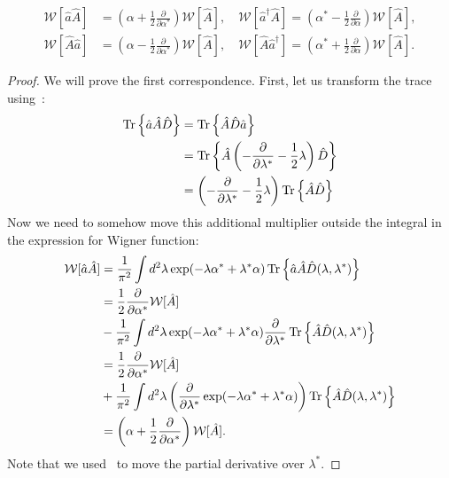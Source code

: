 \begin{theorem}
\label{thm:formalism:sm-wigner:correspondences}
\begin{equation*}
\begin{split}
	\mathcal{W} [ \hat{a} \hat{A} ]
		& = \left( \alpha + \frac{1}{2} \frac{\partial}{\partial \alpha^*} \right) \mathcal{W}[\hat{A}],
	\quad
	\mathcal{W} [ \hat{a}^\dagger \hat{A} ]
		= \left( \alpha^* - \frac{1}{2} \frac{\partial}{\partial \alpha} \right) \mathcal{W}[\hat{A}], \\
	\mathcal{W} [ \hat{A} \hat{a} ]
		& = \left( \alpha - \frac{1}{2} \frac{\partial}{\partial \alpha^*} \right) \mathcal{W}[\hat{A}],
	\quad
	\mathcal{W} [ \hat{A} \hat{a}^\dagger ]
		= \left( \alpha^* + \frac{1}{2} \frac{\partial}{\partial \alpha} \right) \mathcal{W}[\hat{A}].
\end{split}
\end{equation*}
\end{theorem}
\begin{proof}
We will prove the first correspondence.
First, let us transform the trace using~:
\begin{equation*}
\begin{split}
	\operatorname{Tr} \left\{  \hat{a} \hat{A} \hat{D}  \right\}
	& = \operatorname{Tr} \left\{  \hat{A} \hat{D} \hat{a} \right\} \\
	& = \operatorname{Tr} \left\{  \hat{A} \left(
		-\frac{\partial}{\partial \lambda^*}
		-\frac{1}{2} \lambda
	\right) \hat{D} \right\} \\
	& = \left(
		-\frac{\partial}{\partial \lambda^*}
		-\frac{1}{2} \lambda
	\right) \operatorname{Tr} \left\{  \hat{A} \hat{D} \right\}
\end{split}
\end{equation*}
Now we need to somehow move this additional multiplier outside the integral in the expression for Wigner function:
\begin{equation*}
\begin{split}
	\mathcal{W} [ \hat{a} \hat{A} ]
	& = \frac{1}{\pi^2} \int d^2 \lambda \exp(-\lambda \alpha^* + \lambda^* \alpha)
		\operatorname{Tr} \left\{  \hat{a} \hat{A} \hat{D}(\lambda, \lambda^*)  \right\} \\
	& = \frac{1}{2} \frac{\partial}{\partial \alpha^*} \mathcal{W} [\hat{A}] \\
	& - \frac{1}{\pi^2} \int d^2 \lambda \exp(-\lambda \alpha^* + \lambda^* \alpha)
		\frac{\partial}{\partial \lambda^*}
		\operatorname{Tr} \left\{  \hat{A} \hat{D}(\lambda, \lambda^*)  \right\} \\
	& = \frac{1}{2} \frac{\partial}{\partial \alpha^*} \mathcal{W} [\hat{A}] \\
	& + \frac{1}{\pi^2} \int d^2 \lambda \left(
		\frac{\partial}{\partial \lambda^*} \exp(-\lambda \alpha^* + \lambda^* \alpha)
	\right)
	\operatorname{Tr} \left\{  \hat{A} \hat{D}(\lambda, \lambda^*)  \right\} \\
	& = \left( \alpha + \frac{1}{2} \frac{\partial}{\partial \alpha^*} \right) \mathcal{W} [\hat{A}].
\end{split}
\end{equation*}
Note that we used~ to move the partial derivative over $\lambda^*$.
\end{proof}
